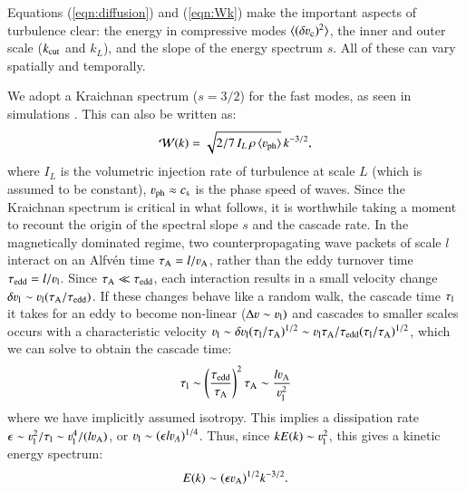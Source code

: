 \documentclass[fleqn,usenatbib,useAMS]{mnras}
\newcommand\cp[1]{{\color{red} #1}}
\newcommand{\Vph}{\varv_\mathrm{ph}}
\begin{document}
Equations (\ref{eqn:diffusion}) and (\ref{eqn:Wk}) make the important aspects of turbulence clear: the energy in compressive modes $\langle (\delta \varv_{\rm c})^{2} \rangle$, the inner and outer scale ($k_{\rm cut}$ and $k_L$), and the slope of the energy spectrum $s$. All of these can vary spatially and temporally. 

We adopt a Kraichnan spectrum ($s=3/2$) for the fast modes, as seen in simulations \citep{cho03}. This can also be written as: 
\begin{equation}
  \label{eq:Wk}
  \mathcal{W}(k) =
\sqrt{2/7\,I_L\,\rho\,\langle \Vph \rangle}\,k^{-3/2},
\end{equation}
where $I_L$ is the volumetric injection rate of turbulence at scale $L$ (which is assumed to be constant), $\varv_{\rm ph}\approx c_{\rm s}$ is the phase speed of waves. \cp{Since the Kraichnan spectrum is critical in what follows, it is worthwhile taking a moment to recount the origin of the spectral slope $s$ and the cascade rate. In the magnetically dominated regime, two counterpropagating wave packets of scale $l$ interact on an Alfv{\'e}n time $\tau_{\rm A}=l/\varv_{\rm A}$, rather than the eddy turnover time $\tau_{\rm edd} = l/\varv_{\rm l}$. 
Since $\tau_{\rm A} \ll \tau_{\rm edd}$, each interaction results in a small velocity change $\delta \varv_{\rm l} \sim \varv_{\rm l} (\tau_{\rm A}/\tau_{\rm edd})$. If these changes behave like a random walk, the cascade time $\tau_{\rm l}$ it takes for an eddy to become non-linear ($\Delta \varv \sim \varv_{\rm l})$ and cascades to smaller scales occurs with a characteristic velocity $\varv_{\rm l} \sim \delta \varv_{\rm l} (\tau_{\rm l}/\tau_{\rm A})^{1/2} \sim \varv_{\rm l} \tau_{\rm A}/\tau_{\rm edd} (\tau_{\rm l}/\tau_{\rm A})^{1/2}$, which we can solve to obtain the cascade time: 
\begin{equation}
  \label{eqn:tau_l}
\tau_{\rm l} \sim \left(\frac{\tau_{\rm edd}}{\tau_{\rm A}}\right)^{2} \tau_{\rm A} \sim \frac{l \varv_{\rm A}}{\varv_{\rm l}^{2}} 
\end{equation}
where we have implicitly assumed isotropy. This implies a dissipation rate $\epsilon \sim \varv_{\rm l}^{2}/\tau_{\rm l} \sim \varv_{\rm l}^{4}/(l \varv_{\rm A})$, or $\varv_{\rm l} \sim (\epsilon l \varv_{A})^{1/4}$. Thus, since $k E(k)\sim \varv_{\rm l}^{2}$, this gives a kinetic energy spectrum: 
\begin{equation}
E(k) \sim (\epsilon \varv_{\rm A})^{1/2} k^{-3/2}.
\end{equation}}
 
\end{document}
